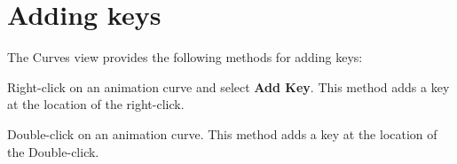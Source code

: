 \chapter{Adding keys}
\hypertarget{md__library_2_package_cache_2com_8unity_8timeline_0d1_87_86_2_documentation_0i_2crv__keys__add}{}\label{md__library_2_package_cache_2com_8unity_8timeline_0d1_87_86_2_documentation_0i_2crv__keys__add}
\label{md__library_2_package_cache_2com_8unity_8timeline_0d1_87_86_2_documentation_0i_2crv__keys__add_autotoc_md1136}%
%
 The Curves view provides the following methods for adding keys\+:


\begin{DoxyItemize}
\item Right-\/click on an animation curve and select {\bfseries{Add Key}}. This method adds a key at the location of the right-\/click.
\item Double-\/click on an animation curve. This method adds a key at the location of the Double-\/click. 
\end{DoxyItemize}